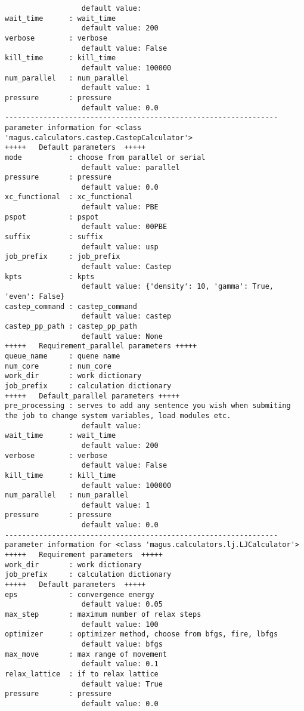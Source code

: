 \documentclass[12pt,oneside]{book}
\begin{document}
\begin{tcolorbox}
\begin{verbatim}
                  default value: 
wait_time      : wait_time
                  default value: 200
verbose        : verbose
                  default value: False
kill_time      : kill_time
                  default value: 100000
num_parallel   : num_parallel
                  default value: 1
pressure       : pressure
                  default value: 0.0
----------------------------------------------------------------
parameter information for <class 'magus.calculators.castep.CastepCalculator'>
+++++	Default parameters	+++++
mode           : choose from parallel or serial
                  default value: parallel
pressure       : pressure
                  default value: 0.0
xc_functional  : xc_functional
                  default value: PBE
pspot          : pspot
                  default value: 00PBE
suffix         : suffix
                  default value: usp
job_prefix     : job_prefix
                  default value: Castep
kpts           : kpts
                  default value: {'density': 10, 'gamma': True, 'even': False}
castep_command : castep_command
                  default value: castep
castep_pp_path : castep_pp_path
                  default value: None
+++++	Requirement_parallel parameters	+++++
queue_name     : quene name
num_core       : num_core
work_dir       : work dictionary
job_prefix     : calculation dictionary
+++++	Default_parallel parameters	+++++
pre_processing : serves to add any sentence you wish when submiting the job to change system variables, load modules etc.
                  default value: 
wait_time      : wait_time
                  default value: 200
verbose        : verbose
                  default value: False
kill_time      : kill_time
                  default value: 100000
num_parallel   : num_parallel
                  default value: 1
pressure       : pressure
                  default value: 0.0
----------------------------------------------------------------
parameter information for <class 'magus.calculators.lj.LJCalculator'>
+++++	Requirement parameters	+++++
work_dir       : work dictionary
job_prefix     : calculation dictionary
+++++	Default parameters	+++++
eps            : convergence energy
                  default value: 0.05
max_step       : maximum number of relax steps
                  default value: 100
optimizer      : optimizer method, choose from bfgs, fire, lbfgs
                  default value: bfgs
max_move       : max range of movement
                  default value: 0.1
relax_lattice  : if to relax lattice
                  default value: True
pressure       : pressure
                  default value: 0.0

\end{verbatim}
\end{tcolorbox}
\end{document}
